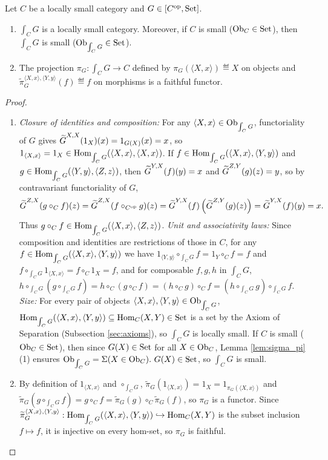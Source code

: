 \documentclass[10pt,a4paper]{article}
\renewcommand{\myprf}{\begin{proof}}
\renewcommand{\myqed}{\end{proof}}
\begin{document}
\begin{lemma}\label{lem:cat_of_elements}
Let $C$ be a locally small category and $G \in [C^{\textrm{op}}, {\textrm{Set}}]$.
\begin{enumerate}
\item $\int_C G$ is a locally small category. Moreover, if $C$ is small (${\textrm{Ob}}_C \in {\textrm{Set}}$), then $\int_C G$ is small (${\textrm{Ob}}_{\int_C G} \in {\textrm{Set}}$).
\item The projection $\pi_G : \int_C G \to C$ defined by $\pi_G(\langle X, x \rangle) \eqdef X$ on objects and $\widetilde{\pi}_G^{\langle X,x\rangle,\langle Y,y\rangle}(f) \eqdef f$ on morphisms is a faithful functor.
\end{enumerate}
\end{lemma}
\myprf
\begin{enumerate}
\item \emph{Closure of identities and composition:} For any $\langle X, x \rangle \in {\textrm{Ob}}_{\int_C G}$, functoriality of $G$ gives ${\widetilde{G}\textrm{}}^{X,X}(1_X)(x) = 1_{G(X)}(x) = x$, so $1_{\langle X,x\rangle} = 1_X \in {\textrm{Hom}}_{\int_C G}(\langle X, x \rangle, \langle X, x \rangle)$. If $f \in {\textrm{Hom}}_{\int_C G}(\langle X, x \rangle, \langle Y, y \rangle)$ and $g \in {\textrm{Hom}}_{\int_C G}(\langle Y, y \rangle, \langle Z, z \rangle)$, then ${\widetilde{G}\textrm{}}^{Y,X}(f)(y) = x$ and ${\widetilde{G}\textrm{}}^{Z,Y}(g)(z) = y$, so by contravariant functoriality of $G$,
$${\widetilde{G}\textrm{}}^{Z,X}(g \circ_C f)(z) = {\widetilde{G}\textrm{}}^{Z,X}(f \circ_{C^{\textrm{op}}} g)(z) = {\widetilde{G}\textrm{}}^{Y,X}(f)\left({\widetilde{G}\textrm{}}^{Z,Y}(g)(z)\right) = {\widetilde{G}\textrm{}}^{Y,X}(f)(y) = x.$$
Thus $g \circ_C f \in {\textrm{Hom}}_{\int_C G}(\langle X, x \rangle, \langle Z, z \rangle)$.
\emph{Unit and associativity laws:} Since composition and identities are restrictions of those in $C$, for any $f \in {\textrm{Hom}}_{\int_C G}(\langle X,x\rangle, \langle Y,y\rangle)$ we have $1_{\langle Y,y\rangle} \circ_{\int_C G} f = 1_Y \circ_C f = f$ and $f \circ_{\int_C G} 1_{\langle X,x\rangle} = f \circ_C 1_X = f$, and for composable $f, g, h$ in $\int_C G$, $h \circ_{\int_C G} (g \circ_{\int_C G} f) = h \circ_C (g \circ_C f) = (h \circ_C g) \circ_C f = (h \circ_{\int_C G} g) \circ_{\int_C G} f$.
\emph{Size:} For every pair of objects $\langle X,x \rangle, \langle Y,y \rangle \in {\textrm{Ob}}_{\int_C G}$, ${\textrm{Hom}}_{\int_C G}(\langle X,x \rangle, \langle Y,y \rangle) \subseteq {\textrm{Hom}}_C(X,Y) \in {\textrm{Set}}$ is a set by the Axiom of Separation (Subsection \ref{sec:axioms}), so $\int_C G$ is locally small. If $C$ is small (${\textrm{Ob}}_C \in {\textrm{Set}}$), then since $G(X) \in {\textrm{Set}}$ for all $X \in {\textrm{Ob}}_C$, Lemma \ref{lem:sigma_pi}(1) ensures ${\textrm{Ob}}_{\int_C G} = \Sigma(X \in {\textrm{Ob}}_C).\ G(X) \in {\textrm{Set}}$, so $\int_C G$ is small.
\item By definition of $1_{\langle X,x\rangle}$ and $\circ_{\int_C G}$, $\widetilde{\pi}_G(1_{\langle X,x\rangle}) = 1_X = 1_{\pi_G(\langle X,x\rangle)}$ and $\widetilde{\pi}_G(g \circ_{\int_C G} f) = g \circ_C f = \widetilde{\pi}_G(g) \circ_C \widetilde{\pi}_G(f)$, so $\pi_G$ is a functor. Since $\widetilde{\pi}_G^{\langle X,x\rangle, \langle Y,y\rangle} : {\textrm{Hom}}_{\int_C G}(\langle X,x \rangle, \langle Y,y \rangle) \hookrightarrow {\textrm{Hom}}_C(X,Y)$ is the subset inclusion $f \mapsto f$, it is injective on every hom-set, so $\pi_G$ is faithful.
\end{enumerate}
\myqed
\end{document}
